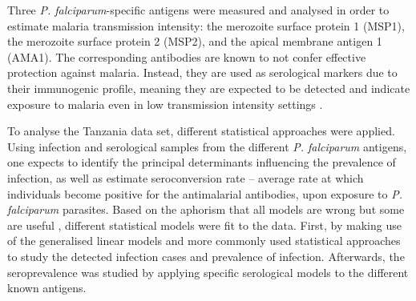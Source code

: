 
Three \textit{P. falciparum}-specific antigens were measured and analysed in order to estimate malaria transmission intensity: the merozoite surface protein 1 (MSP1), the merozoite surface protein 2 (MSP2), and the apical membrane antigen 1 (AMA1).
The corresponding antibodies are known to not confer effective protection against malaria.
Instead, they are used as serological markers due to their immunogenic profile, meaning they are expected to be detected and indicate exposure to malaria even in low transmission intensity settings \cite{reddy2012high, wong2014serological, bousema2010serologic}.

To analyse the Tanzania data set, different statistical approaches were applied.
Using infection and serological samples from the different \textit{P. falciparum} antigens, one expects to identify the principal determinants influencing the prevalence of infection, as well as estimate seroconversion rate -- average rate at which individuals become positive for the antimalarial antibodies, upon exposure to \textit{P. falciparum} parasites.
Based on the aphorism that all models are wrong but some are useful \cite{box2005statistics}, different statistical models were fit to the data.
First, by making use of the generalised linear models and more commonly used statistical approaches to study the detected infection cases and prevalence of infection.
Afterwards, the seroprevalence was studied by applying specific serological models to the different known antigens.

